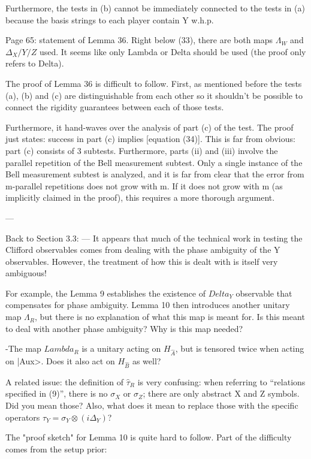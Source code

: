 \documentclass[12pt]{article}
\begin{document}
Furthermore, the tests in (b) cannot be immediately connected to the tests in (a) because the basis strings to each player contain Y w.h.p.

Page 65: statement of Lemma 36. Right below (33), there are both maps $\Lambda_W$ and $\Delta_X/Y/Z$ used. It seems like only Lambda or Delta should be used (the proof only refers to Delta).

The proof of Lemma 36 is difficult to follow. First, as mentioned before the tests (a), (b) and (c) are distinguishable from each other so it shouldn't be possible to connect the rigidity guarantees between each of those tests.

Furthermore,  it hand-waves over the analysis of part (c) of the test. The proof just states: success in part (c) implies [equation (34)]. This is far from obvious: part (c) consists of 3 subtests. Furthermore, parts (ii) and (iii) involve the parallel repetition of the Bell measurement subtest. Only a single instance of the Bell measurement subtest is analyzed, and it is far from clear that the error from m-parallel repetitions does not grow with m.  If it does not grow with m (as implicitly claimed in the proof), this requires a more thorough argument.

---


Back to Section 3.3:
---
It appears that much of the technical work in testing the Clifford observables comes from dealing with the phase ambiguity of the Y observables. However, the treatment of how this is dealt with is itself very ambiguous!

For example, the Lemma 9 establishes the existence of $Delta_Y$ observable that compensates for phase ambiguity. Lemma 10 then introduces another unitary map $\Lambda_R$, but there is no explanation of what this map is meant for. Is this meant to deal with another phase ambiguity? Why is this map needed?

-The map $Lambda_R$ is a unitary acting on $H_{\hat{A}}$, but is tensored twice when acting on |Aux>. Does it also act on $H_{\hat{B}}$ as well? 

A related issue: the definition of $\hat{\tau}_R$ is very confusing: when referring to “relations specified in (9)”, there is no $\sigma_X$ or $\sigma_Z$; there are only abstract X and Z symbols. Did you mean those? Also, what does it mean to replace those with the specific operators $\tau_Y = \sigma_Y \otimes (i \Delta_Y)$? 


The "proof sketch" for Lemma 10 is quite hard to follow. Part of the difficulty comes from the setup prior:
\end{document}
